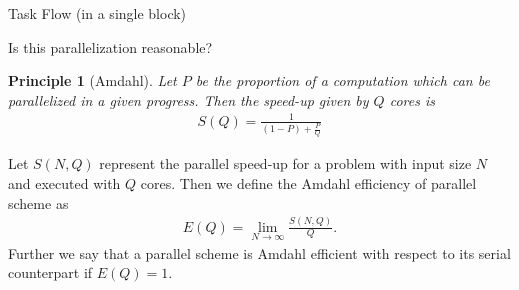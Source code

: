 \documentclass[pdf]{beamer}
\newtheorem{principle}{Principle}
\newcommand{\lra}{\longrightarrow}
\begin{document}
\begin{frame}{Task Flow (in a single block)}
\resizebox{200pt}{!}{

}
\end{frame}
\begin{frame}{Is this parallelization reasonable?}
\begin{principle}[Amdahl]
Let $ P $ be the proportion of a computation which can be parallelized in a given progress. Then the speed-up given by
$ Q $ cores is
\begin{align*}
	S(Q) = \frac{1}{(1-P)+\frac{P}{Q}}
\end{align*}

\end{principle}

\begin{definition}
\label{def:amdahl_efficient}
    Let $ S(N,Q) $ represent the parallel speed-up for a problem with input size $ N $ and executed with $ Q $ cores.
    Then we define the Amdahl efficiency of parallel scheme as 
    \begin{align*}
        E(Q) = \lim_{N \lra \infty} \frac{S(N, Q)}{Q}.
    \end{align*}
    Further we say that a parallel scheme is Amdahl efficient with respect to its serial counterpart if $ E(Q) = 1 $.
\end{definition}
\end{frame}
\end{document}
